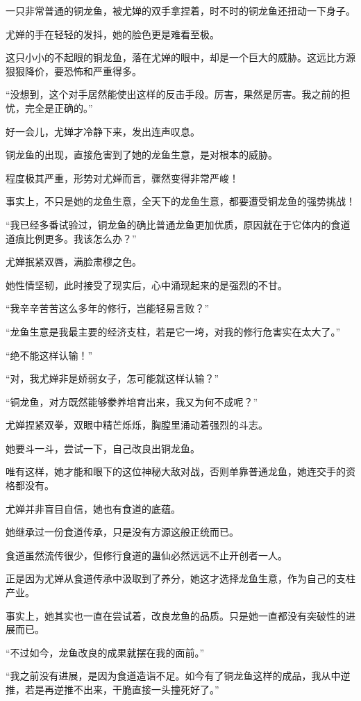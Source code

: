 \begin{this_body}
一只非常普通的铜龙鱼，被尤婵的双手拿捏着，时不时的铜龙鱼还扭动一下身子。

尤婵的手在轻轻的发抖，她的脸色更是难看至极。

这只小小的不起眼的铜龙鱼，落在尤婵的眼中，却是一个巨大的威胁。这远比方源狠狠降价，要恐怖和严重得多。

“没想到，这个对手居然能使出这样的反击手段。厉害，果然是厉害。我之前的担忧，完全是正确的。”

好一会儿，尤婵才冷静下来，发出连声叹息。

铜龙鱼的出现，直接危害到了她的龙鱼生意，是对根本的威胁。

程度极其严重，形势对尤婵而言，骤然变得非常严峻！

事实上，不只是她的龙鱼生意，全天下的龙鱼生意，都要遭受铜龙鱼的强势挑战！

“我已经多番试验过，铜龙鱼的确比普通龙鱼更加优质，原因就在于它体内的食道道痕比例更多。我该怎么办？”

尤婵抿紧双唇，满脸肃穆之色。

她性情坚韧，此时接受了现实后，心中涌现起来的是强烈的不甘。

“我辛辛苦苦这么多年的修行，岂能轻易言败？”

“龙鱼生意是我最主要的经济支柱，若是它一垮，对我的修行危害实在太大了。”

“绝不能这样认输！”

“对，我尤婵非是娇弱女子，怎可能就这样认输？”

“铜龙鱼，对方既然能够豢养培育出来，我又为何不成呢？”

尤婵捏紧双拳，双眼中精芒烁烁，胸膛里涌动着强烈的斗志。

她要斗一斗，尝试一下，自己改良出铜龙鱼。

唯有这样，她才能和眼下的这位神秘大敌对战，否则单靠普通龙鱼，她连交手的资格都没有。

尤婵并非盲目自信，她也有食道的底蕴。

她继承过一份食道传承，只是没有方源这般正统而已。

食道虽然流传很少，但修行食道的蛊仙必然远远不止开创者一人。

正是因为尤婵从食道传承中汲取到了养分，她这才选择龙鱼生意，作为自己的支柱产业。

事实上，她其实也一直在尝试着，改良龙鱼的品质。只是她一直都没有突破性的进展而已。

“不过如今，龙鱼改良的成果就摆在我的面前。”

“我之前没有进展，是因为食道造诣不足。如今有了铜龙鱼这样的成品，我从中逆推，若是再逆推不出来，干脆直接一头撞死好了。”


\end{this_body}
